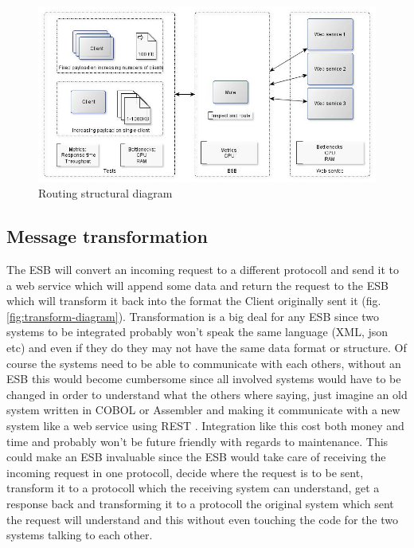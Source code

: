 \begin{figure}[H]
	\centerline{\includegraphics[scale=0.43]{img/Routing}}
	\caption{Routing structural diagram}
	\label{fig:routing-diagram}
\end{figure}

\subsection{Message transformation}
The ESB will convert an incoming request to a different protocoll and send it to a web service which will append some data and return the request to the ESB which will transform it back into the format the Client originally sent it (fig.\ref{fig:transform-diagram}).
Transformation is a big deal for any ESB since two systems to be integrated probably won't speak the same language (XML, json etc) and even if they do they may not have the same data format or structure. Of course the systems need to be able to communicate with each others, without an ESB this would become cumbersome since all involved systems would have to be changed in order to understand what the others where saying, just imagine an old system written in COBOL or Assembler and making it communicate with a new system like a web service using REST \cite{whatisrest}. Integration like this cost both money and time and probably won't be future friendly with regards to maintenance.
This could make an ESB invaluable since the ESB would take care of receiving the incoming request in one protocoll, decide where the request is to be sent, transform it to a protocoll which the receiving system can understand, get a response back and transforming it to a protocoll the original system which sent the request will understand and this without even touching the code for the two systems talking to each other.

